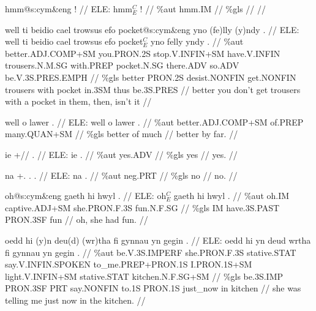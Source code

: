\documentclass[a4paper,10pt]{article}
\begin{document}
\ex
\begingl[lingstyle=gergl]
\glchat hmm@s:cym\&eng ! //
\glsurface ELE:  hmm$^{C}_{E}$ !  //
\glauto \%aut  hmm{\scriptsize .IM}   //
\glmanual \%gls     //
\gleng  //
\endgl
\xe

\ex
\begingl[lingstyle=gergl]
\glchat well ti beidio cael trowsus efo pocket@s:cym\&eng yno (fe)lly (y)ndy . //
\glsurface ELE:  well ti beidio cael trowsus efo pocket$^{C}_{E}$ yno felly yndy .  //
\glauto \%aut  better{\scriptsize .ADJ.COMP+SM} you{\scriptsize .PRON.2S} stop{\scriptsize .V.INFIN+SM} have{\scriptsize .V.INFIN} trousers{\scriptsize .N.M.SG} with{\scriptsize .PREP} pocket{\scriptsize .N.SG} there{\scriptsize .ADV} so{\scriptsize .ADV} be{\scriptsize .V.3S.PRES.EMPH}   //
\glmanual \%gls  better PRON{\scriptsize .2S} desist{\scriptsize .NONFIN} get{\scriptsize .NONFIN} trousers with pocket in{\scriptsize .3SM} thus be{\scriptsize .3S.PRES}   //
\gleng better you don't get trousers with a pocket in them, then, isn't it //
\endgl
\xe

\ex
\begingl[lingstyle=gergl]
\glchat well o lawer . //
\glsurface ELE:  well o lawer .  //
\glauto \%aut  better{\scriptsize .ADJ.COMP+SM} of{\scriptsize .PREP} many{\scriptsize .QUAN+SM}   //
\glmanual \%gls  better of much   //
\gleng better by far. //
\endgl
\xe

\ex
\begingl[lingstyle=gergl]
\glchat ie +// . //
\glsurface ELE:  ie .  //
\glauto \%aut  yes{\scriptsize .ADV}   //
\glmanual \%gls  yes   //
\gleng yes. //
\endgl
\xe

\ex
\begingl[lingstyle=gergl]
\glchat na +. . . //
\glsurface ELE:  na .  //
\glauto \%aut  neg{\scriptsize .PRT}   //
\glmanual \%gls  no   //
\gleng no. //
\endgl
\xe

\ex
\begingl[lingstyle=gergl]
\glchat oh@s:cym\&eng gaeth hi hwyl . //
\glsurface ELE:  oh$^{C}_{E}$ gaeth hi hwyl .  //
\glauto \%aut  oh{\scriptsize .IM} captive{\scriptsize .ADJ+SM} she{\scriptsize .PRON.F.3S} fun{\scriptsize .N.F.SG}   //
\glmanual \%gls  IM have{\scriptsize .3S.PAST} PRON{\scriptsize .3SF} fun   //
\gleng oh, she had fun. //
\endgl
\xe

\ex
\begingl[lingstyle=gergl]
\glchat oedd hi (y)n deu(d) (wr)tha fi gynnau yn gegin . //
\glsurface ELE:  oedd hi yn deud wrtha fi gynnau yn gegin .  //
\glauto \%aut  be{\scriptsize .V.3S.IMPERF} she{\scriptsize .PRON.F.3S} stative{\scriptsize .STAT} say{\scriptsize .V.INFIN.SPOKEN} to\_me{\scriptsize .PREP+PRON.1S} I{\scriptsize .PRON.1S+SM} light{\scriptsize .V.INFIN+SM} stative{\scriptsize .STAT} kitchen{\scriptsize .N.F.SG+SM}   //
\glmanual \%gls  be{\scriptsize .3S.IMP} PRON{\scriptsize .3SF} PRT say{\scriptsize .NONFIN} to{\scriptsize .1S} PRON{\scriptsize .1S} just\_now in kitchen   //
\gleng she was telling me just now in the kitchen. //
\endgl
\xe
\end{document}
